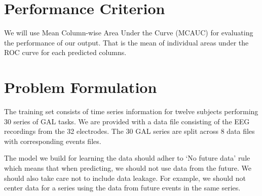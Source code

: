 \documentclass[final,leqno,onefignum,onetabnum]{siamltexmm}
\begin{document}
\section{Performance Criterion}
We will use Mean Column-wise Area Under the Curve (MCAUC) for evaluating the performance of our output.  That is the mean of individual areas under the ROC curve for each predicted columns.

\section{Problem Formulation}
The training set consists of time series information for twelve subjects performing 30 series of GAL tasks.  We are provided with a data file consisting of the EEG recordings from the 32 electrodes.  The 30 GAL series are split across 8 data files with corresponding events files.

The model we build for learning the data should adher to `No future data' rule\cite{kaggledata} which means that when predicting, we should not use data from the future.  We should also take care not to include data leakage.  For example, we should not center data for a series using the data from future events in the same series.
\end{document}
